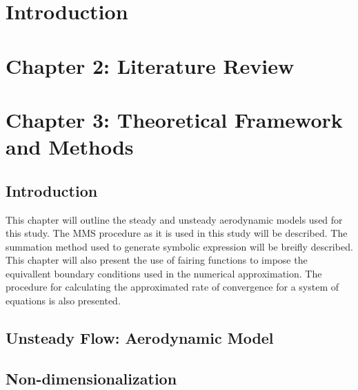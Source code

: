 \documentclass[12pt]{uthesis-v12}  %
\begin{document}
\chapter{Introduction}


\chapter{Chapter 2: Literature Review}



% 

\chapter{Chapter 3: Theoretical Framework and Methods}

\section{Introduction}
This chapter will outline the steady and unsteady aerodynamic
models used for this study. The MMS procedure as it is used in this study will 
be described. The summation method used to generate symbolic expression will 
be breifly described. This chapter will also present the use of fairing functions 
to impose the equivallent boundary conditions used in the numerical approximation.
The procedure for calculating the approximated rate of convergence for a system
of equations is also presented.





\section{Unsteady Flow: Aerodynamic Model}
\section{Non-dimensionalization}

% 
% 

% 
\end{document}
